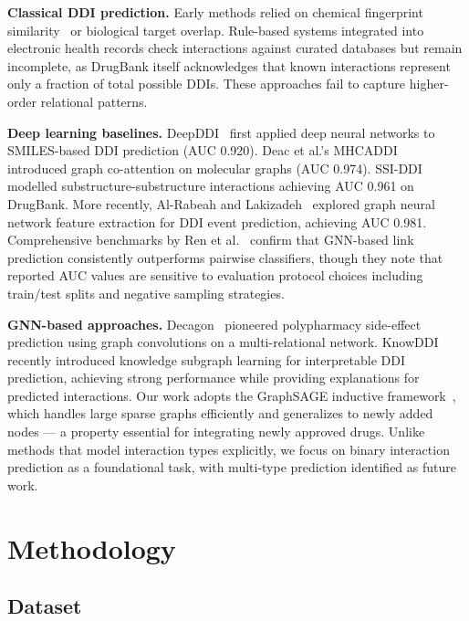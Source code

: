 \documentclass[10pt,twocolumn]{article}
\begin{document}
\textbf{Classical DDI prediction.} Early methods relied on chemical fingerprint
similarity~\cite{rogers2010} or biological target overlap. Rule-based systems
integrated into electronic health records check interactions against curated
databases but remain incomplete, as DrugBank itself acknowledges that known
interactions represent only a fraction of total possible DDIs. These approaches
fail to capture higher-order relational patterns.

\textbf{Deep learning baselines.} DeepDDI~\cite{ryu2018} first applied deep
neural networks to SMILES-based DDI prediction (AUC 0.920). Deac et al.'s
MHCADDI~\cite{deac2019} introduced graph co-attention on molecular graphs (AUC
0.974). SSI-DDI~\cite{nyamabo2021} modelled substructure-substructure interactions
achieving AUC 0.961 on DrugBank. More recently, Al-Rabeah and Lakizadeh~\cite{peng2022}
explored graph neural network feature extraction for DDI event prediction, achieving
AUC 0.981. Comprehensive benchmarks by Ren et al.~\cite{ren2023} confirm that
GNN-based link prediction consistently outperforms pairwise classifiers, though
they note that reported AUC values are sensitive to evaluation protocol choices
including train/test splits and negative sampling strategies.

\textbf{GNN-based approaches.} Decagon~\cite{zitnik2018} pioneered polypharmacy
side-effect prediction using graph convolutions on a multi-relational network.
KnowDDI~\cite{wang2024} recently introduced knowledge subgraph learning for
interpretable DDI prediction, achieving strong performance while providing
explanations for predicted interactions. Our work adopts the GraphSAGE
inductive framework~\cite{hamilton2017}, which handles large sparse graphs
efficiently and generalizes to newly added nodes --- a property essential for
integrating newly approved drugs. Unlike methods that model interaction types
explicitly, we focus on binary interaction prediction as a foundational task,
with multi-type prediction identified as future work.

\section{Methodology}

\subsection{Dataset}
\end{document}
